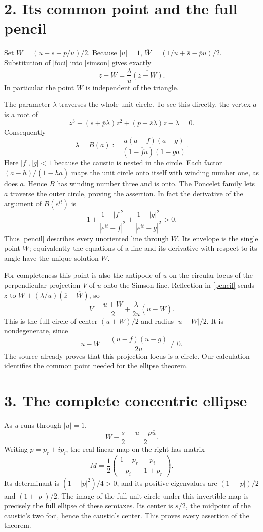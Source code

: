 \documentclass[11pt]{article}
\newcommand{\bc}[1]{\overline{#1}}
\begin{document}
\newpage
\section*{2. Its common point and the full pencil}
Set $W=(u+s-p/u)/2$. Because $|u|=1$,
$\bc W=(1/u+\bc s-\bc p u)/2$.
Substitution of \eqref{foci} into \eqref{simson} gives exactly
\begin{equation}\label{pencil}
            z-W=\frac{\lambda}{u}\bc{(z-W)}.
\end{equation}
In particular the point $W$ is independent of the triangle.

The parameter $\lambda$ traverses the whole unit circle. To see this
directly, the vertex $a$ is a root of
\[
 z^3-(s+\bc p\lambda)z^2+(p+\bc s\lambda)z-\lambda=0.
\]
Consequently
\[
 \lambda=B(a):=\frac{a(a-f)(a-g)}
                       {(1-\bc f a)(1-\bc g a)}.
\]
Here $|f|,|g|<1$ because the caustic is nested in the circle. Each factor
$(a-h)/(1-\bc h a)$ maps the unit circle onto itself with winding number
one, as does $a$. Hence $B$ has winding number three and is onto. The
Poncelet family lets $a$ traverse the outer circle, proving the assertion.
In fact the derivative of the argument of $B(e^{it})$ is
\[
 1+\frac{1-|f|^2}{|e^{it}-f|^2}
   +\frac{1-|g|^2}{|e^{it}-g|^2}>0.
\]
Thus \eqref{pencil} describes every unoriented line through $W$. Its
envelope is the single point $W$; equivalently the equations of a line
and its derivative with respect to its angle have the unique solution
$W$.

For completeness this point is also the antipode of $u$ on the circular
locus of the perpendicular projection $V$ of $u$ onto the Simson line.
Reflection in \eqref{pencil} sends $z$ to
$W+(\lambda/u)(\bc z-\bc W)$, so
\[
 V=\frac{u+W}{2}+\frac{\lambda}{2u}(\bc u-\bc W).
\]
This is the full circle of center $(u+W)/2$ and radius $|u-W|/2$.
It is nondegenerate, since
\[
                    u-W=\frac{(u-f)(u-g)}{2u}\ne0.
\]
The source already proves that this projection locus is a circle. Our
calculation identifies the common point needed for the ellipse theorem.

\section*{3. The complete concentric ellipse}
As $u$ runs through $|u|=1$,
\begin{equation}\label{ellipse}
             W-\frac s2=\frac{u-p\bc u}{2}.
\end{equation}
Writing $p=p_r+ip_i$, the real linear map on the right has matrix
\[
 M=\frac12
 \begin{pmatrix}1-p_r&-p_i\\-p_i&1+p_r\end{pmatrix}.
\]
Its determinant is $(1-|p|^2)/4>0$, and its positive eigenvalues are
$(1-|p|)/2$ and $(1+|p|)/2$. The image of the full unit circle under
this invertible map is precisely the full ellipse of these semiaxes.
Its center is $s/2$, the midpoint of the caustic's two foci, hence the
caustic's center. This proves every assertion of the theorem.
\end{document}
